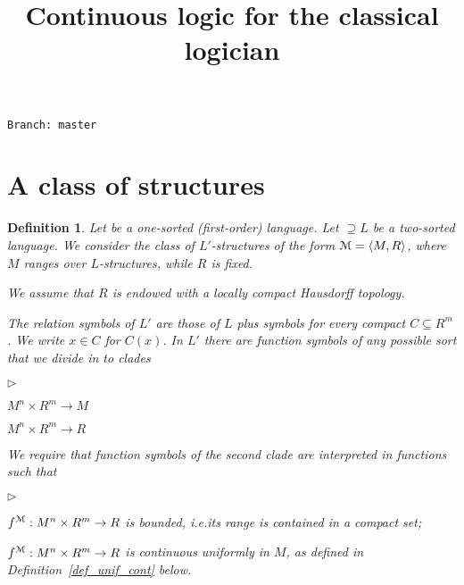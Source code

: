 \documentclass[12pt,letterpaper,oneside,reqno]{amsart}
\newcommand{\mylabel}[1]{{#1}\hfill}
\renewenvironment{itemize}
  {\begin{list}{$\triangleright$}{%
   \setlength{\parskip}{0mm}
   \setlength{\topsep}{.2\baselineskip}
   \setlength{\rightmargin}{0mm}
   \setlength{\listparindent}{0mm}
   \setlength{\itemindent}{0mm}
   \setlength{\labelwidth}{3ex}
   \setlength{\itemsep}{.2\baselineskip}
   \setlength{\parsep}{.2\baselineskip}
   \setlength{\partopsep}{0mm}
   \setlength{\labelsep}{1ex}
   \setlength{\leftmargin}{\labelwidth+\labelsep}
   \let\makelabel\mylabel}}{%
   \end{list}}
\theoremstyle{plain}
\newtheorem{definition}[theorem]{Definition}
\theoremstyle{remark}
\renewcommand*{\emph}[1]{%
   \smash{\tikz[baseline]\node[rectangle, fill=olive!25, rounded corners, inner xsep=0.5ex, inner ysep=0.2ex, anchor=base, minimum height = 2.7ex]{#1};}}
\begin{document}
\title{Continuous logic for the classical logician}
\hfill\texttt{Branch:\ master\ \DTMnow}\bigskip
\maketitle
\raggedbottom
\section{A class of structures}\label{uno}


\def\ceq#1#2#3{\parbox[t]{28ex}{$\displaystyle #1$}\parbox{6ex}{\hfil $#2$}{$\displaystyle #3$}}



\begin{definition}\label{def_0}
  Let \emph{$L$\/} be a one-sorted (first-order) language.
  Let \emph{$L'$\/}$\supseteq L$ be a two-sorted language.
  We consider the class of $L'$-structures of the form ${\EuScript M}=\langle  M,R\rangle$, where $M$ ranges over $L$-structures, while $R$ is fixed.

  We assume that $R$ is endowed with a locally compact Hausdorff topology.
  
  The relation symbols of $L'$ are those of $L$ plus symbols for every compact $C\subseteq R^m$. 
  We write $x\in C$ for $C(x)$.
  In $L'$ there are function symbols of any possible sort that we divide in to clades
  \begin{itemize}
    \item[1.] $M^n\times R^m\to M$
    \item[2.] $M^n\times R^m\to R$
  \end{itemize}
  
  We require that function symbols of the second clade are interpreted in functions such that
  \begin{itemize}
    \item[i.] $f^{\EuScript M}:M^n\times R^m\to R$ is bounded, i.e.\@ its range is contained in a compact set;
    \item[ii.] $f^{\EuScript M}:M^n\times R^m\to R$ is continuous uniformly in $M$, as defined in Definition~\ref{def_unif_cont} below.
 
    
    
    
  \end{itemize}
\end{definition}
\end{document}
